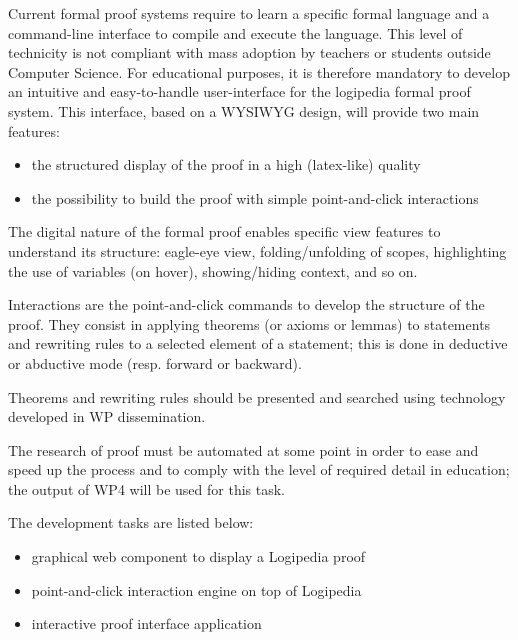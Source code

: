 \begin{workpackage}[id=access,wphases=0-48,type=MGT,
  short=Access,%
  title={Access to the infrastructure},
  lead=Inr,
  InrRM=28,%
  OcaRM=6]
\begin{tasklist}
  \begin{task}[id=edukera,
      title=Web interface for doing proofs at school,
      lead=Edu,EduRM=12]

      Current formal proof systems require to learn a specific formal language
      and a command-line interface to compile and execute the language.
      This level of technicity is not compliant with mass adoption by teachers
      or students outside Computer Science. For educational purposes, it is
      therefore mandatory to develop an intuitive and easy-to-handle
      user-interface for the logipedia formal proof system. This interface,
      based on a WYSIWYG design, will provide two main features:
      \begin{itemize}
        \item the structured display of the proof in a high (latex-like) quality
        \item the possibility to build the proof with simple point-and-click interactions
      \end{itemize}

      The digital nature of the formal proof enables specific view features to
      understand its structure: eagle-eye view, folding/unfolding of scopes,
      highlighting the use of variables (on hover), showing/hiding context,
      and so on.

      Interactions are the point-and-click commands to develop the structure
      of the proof. They consist in applying theorems (or axioms or lemmas)
      to statements and rewriting rules to a selected element of a statement;
      this is done in deductive or abductive mode (resp. forward or backward).

      Theorems and rewriting rules should be presented and searched using
      technology developed in WP dissemination.

      The research of proof must be automated at some point in order to ease
      and speed up the process and to comply with the level of required detail
      in education; the output of WP4 will be used for this task.

      The development tasks are listed below:
      \begin{itemize}
        \item graphical web component to display a Logipedia proof
        \item point-and-click interaction engine on top of Logipedia
        \item interactive proof interface application
      \end{itemize}


\end{task}
\end{tasklist}
\end{workpackage}

